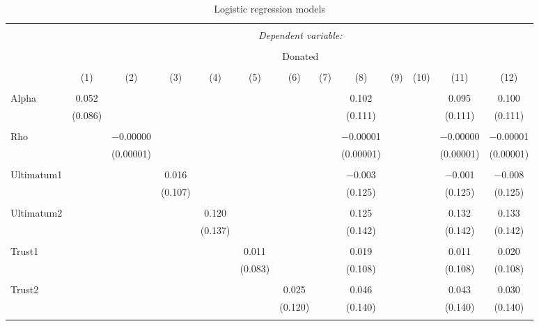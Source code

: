 \begin{table}[H] \centering 
  \caption{Logistic regression models} 
  \label{} 
  \begin{adjustbox}{width=\textwidth}
\begin{tabular}{@{\extracolsep{5pt}}lcccccccccccc} 
\\[-1.8ex]\hline 
\hline \\[-1.8ex] 
 & \multicolumn{12}{c}{\textit{Dependent variable:}} \\ 
\cline{2-13} 
\\[-1.8ex] & \multicolumn{12}{c}{Donated} \\ 
\\[-1.8ex] & (1) & (2) & (3) & (4) & (5) & (6) & (7) & (8) & (9) & (10) & (11) & (12)\\ 
\hline \\[-1.8ex] 
 Alpha & 0.052 &  &  &  &  &  &  & 0.102 &  &  & 0.095 & 0.100 \\ 
  & (0.086) &  &  &  &  &  &  & (0.111) &  &  & (0.111) & (0.111) \\ 
  & & & & & & & & & & & & \\ 
 Rho &  & $-$0.00000 &  &  &  &  &  & $-$0.00001 &  &  & $-$0.00000 & $-$0.00001 \\ 
  &  & (0.00001) &  &  &  &  &  & (0.00001) &  &  & (0.00001) & (0.00001) \\ 
  & & & & & & & & & & & & \\ 
 Ultimatum1 &  &  & 0.016 &  &  &  &  & $-$0.003 &  &  & $-$0.001 & $-$0.008 \\ 
  &  &  & (0.107) &  &  &  &  & (0.125) &  &  & (0.125) & (0.125) \\ 
  & & & & & & & & & & & & \\ 
 Ultimatum2 &  &  &  & 0.120 &  &  &  & 0.125 &  &  & 0.132 & 0.133 \\ 
  &  &  &  & (0.137) &  &  &  & (0.142) &  &  & (0.142) & (0.142) \\ 
  & & & & & & & & & & & & \\ 
 Trust1 &  &  &  &  & 0.011 &  &  & 0.019 &  &  & 0.011 & 0.020 \\ 
  &  &  &  &  & (0.083) &  &  & (0.108) &  &  & (0.108) & (0.108) \\ 
  & & & & & & & & & & & & \\ 
 Trust2 &  &  &  &  &  & 0.025 &  & 0.046 &  &  & 0.043 & 0.030 \\ 
  &  &  &  &  &  & (0.120) &  & (0.140) &  &  & (0.140) & (0.140) \\ 
  & & & & & & & & & & & & \\ 

\end{tabular}
\end{adjustbox}
\end{table}
